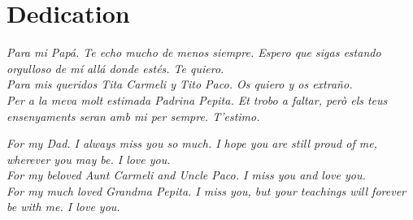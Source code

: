 \chapter*{Dedication} %

\textit{Para mi Papá. Te echo mucho de menos siempre. Espero que sigas estando orgulloso de mí allá donde estés. Te quiero.}\\[0.25cm]

\noindent\textit{Para mis queridos Tita Carmeli y Tito Paco. Os quiero y os extraño.}\\[0.25cm]

\noindent\textit{Per a la meva molt estimada Padrina Pepita. Et trobo a faltar, però els teus ensenyaments seran amb mi per sempre. T'estimo.}\\[0.25cm]

\vspace{+60pt}

\noindent\textit{For my Dad. I always miss you so much. I hope you are still proud of me, wherever you may be. I love you.}\\[0.25cm]

\noindent\textit{For my beloved Aunt Carmeli and Uncle Paco. I miss you and love you.}\\[0.25cm]

\noindent\textit{For my much loved Grandma Pepita. I miss you, but your teachings will forever be with me. I love you.}\\[0.25cm]